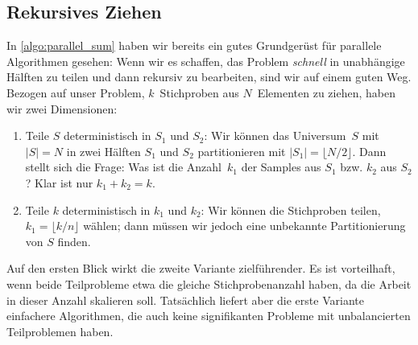 \subsection{Rekursives Ziehen}
In \cref{algo:parallel_sum} haben wir bereits ein gutes Grundgerüst für parallele Algorithmen gesehen:
Wenn wir es schaffen, das Problem \emph{schnell} in unabhängige Hälften zu teilen und dann rekursiv zu bearbeiten, sind wir auf einem guten Weg.
Bezogen auf unser Problem, $k$~Stichproben aus $N$~Elementen zu ziehen, haben wir zwei Dimensionen:
\begin{enumerate}
    \item Teile $S$ deterministisch in $S_1$ und $S_2$: Wir können das Universum~$S$ mit $|S| = N$ in zwei Hälften $S_1$ und $S_2$ partitionieren mit $|S_1| = \lfloor N / 2 \rfloor$.
          Dann stellt sich die Frage: Was ist die Anzahl~$k_1$ der Samples aus $S_1$ bzw. $k_2$ aus $S_2$? Klar ist nur $k_1 + k_2 = k$.

    \item Teile $k$ deterministisch in $k_1$ und $k_2$: Wir können die Stichproben teilen, \dh $k_1 = \lfloor k/n \rfloor$ wählen; dann müssen wir jedoch eine unbekannte Partitionierung von $S$ finden.
\end{enumerate}

Auf den ersten Blick wirkt die zweite Variante zielführender.
Es ist vorteilhaft, wenn beide Teilprobleme etwa die gleiche Stichprobenanzahl haben, da die Arbeit in dieser Anzahl skalieren soll.
Tatsächlich liefert aber die erste Variante einfachere Algorithmen, die auch keine signifikanten Probleme mit unbalancierten Teilproblemen haben.

